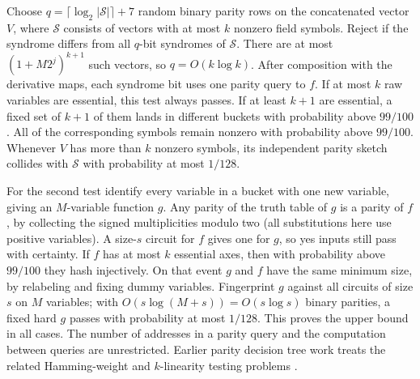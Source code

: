 Choose $q=\lceil\log_2|\mathcal S|\rceil+7$ random binary parity rows on the concatenated vector $V$, where $\mathcal S$ consists of vectors with at most $k$ nonzero field symbols. Reject if the syndrome differs from all $q$-bit syndromes of $\mathcal S$. There are at most $(1+M2^j)^{k+1}$ such vectors, so $q=O(k\log k)$. After composition with the derivative maps, each syndrome bit uses one parity query to $f$. If at most $k$ raw variables are essential, this test always passes. If at least $k+1$ are essential, a fixed set of $k+1$ of them lands in different buckets with probability above $99/100$. All of the corresponding symbols remain nonzero with probability above $99/100$. Whenever $V$ has more than $k$ nonzero symbols, its independent parity sketch collides with $\mathcal S$ with probability at most $1/128$.

For the second test identify every variable in a bucket with one new variable, giving an $M$-variable function $g$. Any parity of the truth table of $g$ is a parity of $f$, by collecting the signed multiplicities modulo two (all substitutions here use positive variables). A size-$s$ circuit for $f$ gives one for $g$, so yes inputs still pass with certainty. If $f$ has at most $k$ essential axes, then with probability above $99/100$ they hash injectively. On that event $g$ and $f$ have the same minimum size, by relabeling and fixing dummy variables. Fingerprint $g$ against all circuits of size $s$ on $M$ variables; with $O(s\log(M+s))=O(s\log s)$ binary parities, a fixed hard $g$ passes with probability at most $1/128$. This proves the upper bound in all cases. The number of addresses in a parity query and the computation between queries are unrestricted. Earlier parity decision tree work treats the related Hamming-weight and $k$-linearity testing problems \cite{bsh}.
